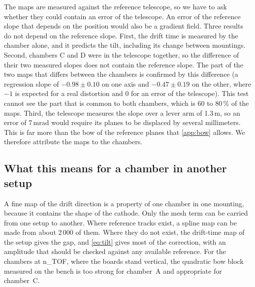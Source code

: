 The maps are measured against the reference telescope, so we have to ask whether they could contain an error of the
telescope. An error of the reference slope that depends on the position would also be a gradient field. Three results
do not depend on the reference slope. First, the drift time is measured by the chamber alone, and it predicts the
tilt, including its change between mountings. Second, chambers C and D were in the telescope together, so the
difference of their two measured slopes does not contain the reference slope. The part of the two maps that differs
between the chambers is confirmed by this difference (a regression slope of $-0.98\pm0.10$ on one axis and
$-0.47\pm0.19$ on the other, where $-1$ is expected for a real distortion and 0 for an error of the telescope). This
test cannot see the part that is common to both chambers, which is 60 to 80\,\% of the maps. Third, the telescope
measures the slope over a lever arm of 1.3\,m, so an error of 7\,mrad would require its planes to be displaced by
several millimeters. This is far more than the bow of the reference planes that \cref{app:bow} allows. We therefore
attribute the maps to the chambers.

\subsection{What this means for a chamber in another setup}
A fine map of the drift direction is a property of one chamber in one mounting, because it contains the shape of the
cathode. Only the mesh term can be carried from one setup to another. Where reference tracks exist, a spline map can
be made from about 2\,000 of them. Where they do not exist, the drift-time map of the setup gives the gap, and
\cref{eq:tilt} gives most of the correction, with an amplitude that should be checked against any available reference.
For the chambers at n\_TOF, where the boards stand vertical, the quadratic bow block measured on the bench is too
strong for chamber~A and appropriate for chamber~C.

